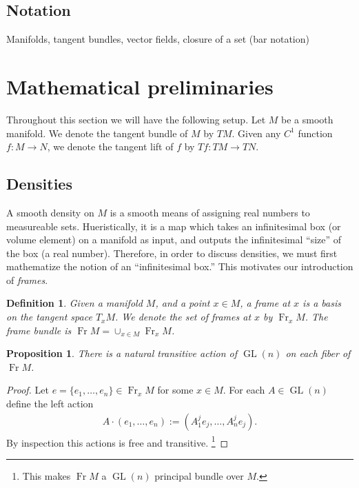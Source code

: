 \documentclass[letterpaper, 12 pt]{amsart}
\newtheorem{defn}[thm]{Definition}
\newtheorem{prop}[thm]{Proposition}
\DeclareMathOperator{\Fr}{Fr}
\DeclareMathOperator{\GL}{GL}
\begin{document}
\subsection{Notation}
  Manifolds, tangent bundles, vector fields, closure of a set (bar notation)

\section{Mathematical preliminaries}
\label{sec:math}
  Throughout this section we will have the following
  setup.  Let $M$ be a smooth manifold.
  We denote the tangent bundle of $M$ by $TM$.
  Given any $C^1$ function $f:M \to N$,
  we denote the tangent lift of $f$ by $Tf:TM \to TN$.

\subsection{Densities}
  A smooth density on $M$ is a smooth means of
  assigning real numbers to measureable sets.
  Hueristically, it is a map which
  takes an infinitesimal box (or volume element)
  on a manifold as input, and outputs the infinitesimal ``size''
  of the box (a real number).
  Therefore, in order to discuss densities,
  we must first mathematize the notion of an ``infinitesimal box.''
  This motivates our introduction of \emph{frames}.
  \begin{defn}
  \label{eq:frame_bundle}
    Given a manifold $M$, and a point $x \in M$,
    a \emph{frame at $x$} is a basis on the tangent space $T_x M$.
    We denote the set of frames at $x$ by $\Fr_x M$.
    The frame bundle is $\Fr M = \cup_{x \in M} \Fr_x M$.
  \end{defn}

  \begin{prop}
    There is a natural transitive
    action of $\GL(n)$ on each fiber of $\Fr M$.
  \end{prop}

  \begin{proof}
    Let $e = \{ e_1,\dots,e_n \} \in \Fr_x M$ for some $x \in M$.
    For each $A \in \GL(n)$ define the left action
    \begin{align*}
      A \cdot (e_1,\dots,e_n) := (A^j_1 e_j , \dots, A_n^j e_j ). 
    \end{align*}
    By inspection this actions is free and transitive.
    \footnote{This makes $\Fr M$ a $\GL(n)$ principal bundle over $M$.}
  \end{proof}
\end{document}
